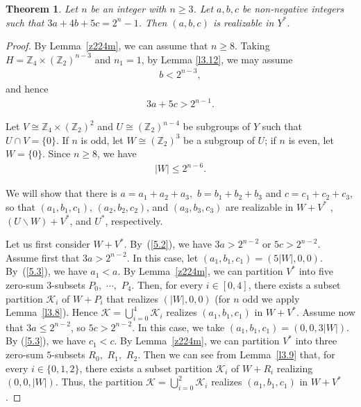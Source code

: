 \documentclass[final]{dmtcs-episciences}
\newtheorem{thm}{Theorem}[section]
\newcommand{\zet}{\mathbb{Z}}
\begin{document}
\begin{thm}\label{z224} Let $n$ be an integer with $n\geq 3$. Let $a,b,c$ be non-negative integers such that $3a+4b+5c=2^n-1$. Then $(a,b,c)$ is realizable in $Y^*$. \end{thm}

\begin{proof}
By Lemma~\ref{z224m}, we can assume that $n\geq 8$.
Taking  $H =\zet_4\times(\zet_2)^{n-3}$ and  $n_1=1$, by Lemma \ref{l3.12}, we may assume
\begin{align} \label{5.1}
b<2^{n-3},
\end{align}
and hence
\begin{align} \label{5.2}
3a+5c>2^{n-1}.
\end{align}

Let $V\cong\zet_4\times (\zet_2)^2$ and $U\cong (\zet_2)^{n-4}$  be subgroups of $Y$ such that $U\cap V=\{0\}$. If $n$ is odd, let $W\cong(\zet_2)^3$
be a subgroup  of $U$; if $n$ is even, let $W=\{0\}$. Since $n\geq 8$, we have
\begin{align} \label{5.3}
|W|\leq 2^{n-6}.
\end{align}

We will show that there is $a=a_{1}+a_{2}+a_{3},$ $b=b_{1}+b_{2}+b_{3}$ and $c=c_{1}+c_{2}+c_{3}$,
so that $(a_{1}, b_{1}, c_{1})$, $(a_{2}, b_{2}, c_{2})$, and $(a_{3}, b_{3}, c_{3})$ are realizable in $W+V^{*}$ ,
$(U\backslash W)+V^{*}$, and $U^{*}$, respectively. 

Let us first consider $W+V^{*}$. By~(\ref{5.2}), we have $3a>2^{n-2}$ or $5c>2^{n-2}$. Assume
first that $3a>2^{n-2}$. In this case, let $(a_{1}, b_{1}, c_{1})=(5|W|, 0,0)$. By~(\ref{5.3}), we have $a_{1}<a$.
By Lemma~\ref{z224m}, we can partition $V^{*}$ into five zero-sum $3$-subsets $P_{0},$ $\cdots,$ $P_{4}$. Then, for every $i\in[0,4]$, there exists a subset partition $\mathcal{K}_{i}$ of $W+P_{i}$ that realizes $(|W|, 0,0)$ (for $n$ odd we apply Lemma~\ref{l3.8}). Hence
$\mathcal{K}=\bigcup_{i=0}^{4}\mathcal{K}_{i}$ realizes $(a_{1}, b_{1}, c_{1})$ in $W+V^{*}$. Assume now that $3a\leq 2^{n-2}$, so
$5c>2^{n-2}$. In this case, we take $(a_{1}, b_{1}, c_{1})=(0,0,3|W|)$. By (\ref{5.3}), we have $c_{1}<c$. By Lemma~\ref{z224m}, we can partition $V^{*}$ into three zero-sum $5$-subsets $R_{0},$ $R_{1},$ $R_{2}$. Then we can see from Lemma~\ref{l3.9} that, for every $i\in\{0,1,2\}$, there exists a subset partition $\mathcal{K}_{i}$ of $W+R_{i}$ realizing $(0, 0, |W|)$. Thus, the partition $\mathcal{K}=\bigcup_{i=0}^{2}\mathcal{K}_{i}$ realizes
$(a_{1}, b_{1}, c_{1})$ in $W+V^{*}$.



\end{proof}
\end{document}
